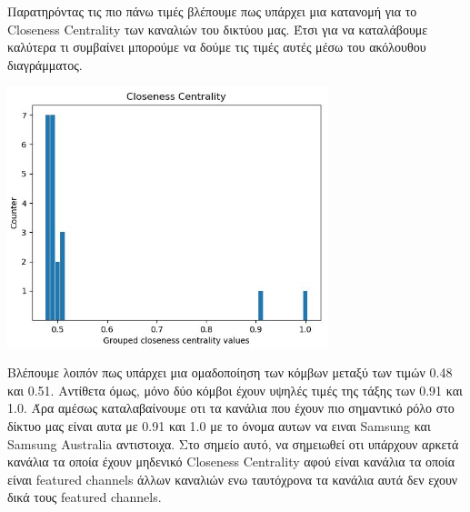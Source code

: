 \documentclass[12pt]{article}
\begin{document}
	\newpage
	Παρατηρόντας τις πιο πάνω τιμές βλέπουμε πως υπάρχει μια κατανομή για το Closeness Centrality των καναλιών του δικτύου μας. Έτσι για να καταλάβουμε καλύτερα τι συμβαίνει μπορούμε να δούμε τις τιμές αυτές μέσω του ακόλουθου διαγράμματος.
	\vspace{12pt}
	
	\begin{center}
		\includegraphics[width=0.7\textwidth]{photos-files/section7/bar_chart_for_7.3.JPG}
	\end{center}
	Βλέπουμε λοιπόν πως υπάρχει μια ομαδοποίηση των κόμβων μεταξύ των τιμών 0.48 και 0.51. Αντίθετα όμως, μόνο δύο κόμβοι έχουν υψηλές τιμές της τάξης των 0.91 και 1.0. Άρα αμέσως καταλαβαίνουμε οτι τα κανάλια που έχουν πιο σημαντικό ρόλο στο δίκτυο μας είναι αυτα με 0.91 και 1.0 με το όνομα αυτων να ειναι Samsung και Samsung Australia αντιστοιχα. Στο σημείο αυτό, να σημειωθεί οτι υπάρχουν αρκετά κανάλια τα οποία έχουν μηδενικό Closeness Centrality αφού είναι κανάλια τα οποία είναι featured channels άλλων καναλιών ενω ταυτόχρονα τα κανάλια αυτά δεν εχουν δικά τους featured channels.
	
	
	\newpage
\end{document}

